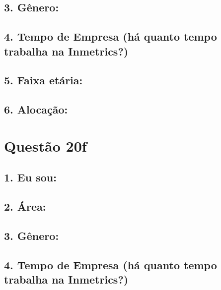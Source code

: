 \documentclass[]{book}
\begin{document}
\hypertarget{genero-57}{%
\subsection{3. Gênero:}\label{genero-57}}

\hypertarget{tempo-de-empresa-ha-quanto-tempo-trabalha-na-inmetrics-57}{%
\subsection{4. Tempo de Empresa (há quanto tempo trabalha na Inmetrics?)}\label{tempo-de-empresa-ha-quanto-tempo-trabalha-na-inmetrics-57}}

\hypertarget{faixa-etaria-57}{%
\subsection{5. Faixa etária:}\label{faixa-etaria-57}}

\hypertarget{alocacao-57}{%
\subsection{6. Alocação:}\label{alocacao-57}}

\hypertarget{questao-20f}{%
\section{Questão 20f}\label{questao-20f}}

\hypertarget{eu-sou-58}{%
\subsection{1. Eu sou:}\label{eu-sou-58}}

\hypertarget{area-58}{%
\subsection{2. Área:}\label{area-58}}

\hypertarget{genero-58}{%
\subsection{3. Gênero:}\label{genero-58}}

\hypertarget{tempo-de-empresa-ha-quanto-tempo-trabalha-na-inmetrics-58}{%
\subsection{4. Tempo de Empresa (há quanto tempo trabalha na Inmetrics?)}\label{tempo-de-empresa-ha-quanto-tempo-trabalha-na-inmetrics-58}}
\end{document}
